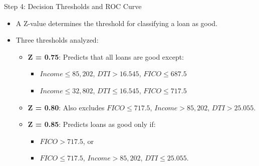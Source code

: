 \documentclass[11pt]{beamer}
\begin{document}
\begin{frame}{Step 4: Decision Thresholds and ROC Curve}
    \begin{itemize}
        \item A Z-value determines the threshold for classifying a loan as good.
        \item Three thresholds analyzed:
        \begin{itemize}
            \item \textbf{Z = 0.75}: Predicts that all loans are good except:
            \begin{itemize}
                \item $Income \le 85,202$, $DTI > 16.545$, $FICO \le 687.5$
                \item $Income \le 32,802$, $DTI \le 16.545$, $FICO \le 717.5$
            \end{itemize}
            \item \textbf{Z = 0.80}: Also excludes $FICO \le 717.5$, $Income > 85,202$, $DTI > 25.055$.
            \item \textbf{Z = 0.85}: Predicts loans as good only if:
            \begin{itemize}
                \item $FICO > 717.5$, or
                \item $FICO \le 717.5$, $Income > 85,202$, $DTI \le 25.055$.
            \end{itemize}
        \end{itemize}
    \end{itemize}
\end{frame}
%
%
\end{document}
